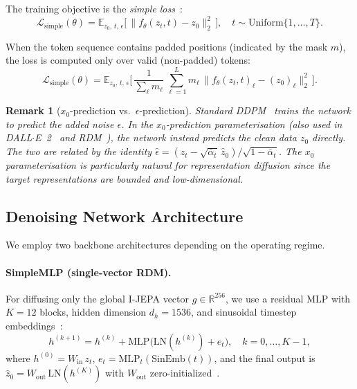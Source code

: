 \documentclass[12pt]{article}
\newtheorem{remark}{Remark}
\begin{document}
The training objective is the \emph{simple loss}~\cite{ho2020ddpm}:
\begin{equation}\label{eq:ddpm-loss}
    \mathcal{L}_{\mathrm{simple}}(\theta)
    = \mathbb{E}_{z_0,\, t,\, \epsilon}\!
    \bigl[\,\lVert f_\theta(z_t, t) - z_0 \rVert_2^2 \,\bigr],
    \quad t \sim \mathrm{Uniform}\{1, \ldots, T\}.
\end{equation}

When the token sequence contains padded positions (indicated by the mask $m$),
the loss is computed only over valid (non-padded) tokens:
\begin{equation}\label{eq:masked-loss}
    \mathcal{L}_{\mathrm{simple}}(\theta)
    = \mathbb{E}_{z_0,\, t,\, \epsilon}\!\biggl[\,
    \frac{1}{\sum_{\ell} m_\ell}\,
    \sum_{\ell=1}^{L} m_\ell\,
    \lVert f_\theta(z_t, t)_\ell - (z_0)_\ell \rVert_2^2
    \,\biggr].
\end{equation}

\begin{remark}[$x_0$-prediction vs.\ $\epsilon$-prediction]
\label{rem:x0-vs-eps}
Standard DDPM~\cite{ho2020ddpm} trains the network to predict the added noise
$\epsilon$.  In the $x_0$-prediction parameterisation
(also used in DALL$\cdot$E~2~\cite{ramesh2022hierarchical} and
RDM~\cite{bordes2022rdm}),
the network instead predicts the clean data $z_0$ directly.
The two are related by the identity
$\hat{\epsilon} = (z_t - \sqrt{\bar{\alpha}_t}\,\hat{z}_0) / \sqrt{1 - \bar{\alpha}_t}$.
The $x_0$ parameterisation is particularly natural for representation
diffusion since the target representations are bounded and low-dimensional.
\end{remark}

\subsection{Denoising Network Architecture}
\label{sec:denoising-arch}

We employ two backbone architectures depending on the operating regime.

\paragraph{SimpleMLP (single-vector RDM).}
For diffusing only the global I-JEPA vector $g \in \mathbb{R}^{256}$,
we use a residual MLP with $K = 12$ blocks,
hidden dimension $d_h = 1536$,
and sinusoidal timestep embeddings~\cite{vaswani2017attention}:
\begin{equation}\label{eq:mlp-block}
    h^{(k+1)} = h^{(k)} + \mathrm{MLP}\!\bigl(\mathrm{LN}(h^{(k)}) + e_t\bigr),
    \quad k = 0, \ldots, K-1,
\end{equation}
where $h^{(0)} = W_{\mathrm{in}}\, z_t$, $e_t = \mathrm{MLP}_t(\mathrm{SinEmb}(t))$,
and the final output is $\hat{z}_0 = W_{\mathrm{out}}\, \mathrm{LN}(h^{(K)})$
with $W_{\mathrm{out}}$ zero-initialized~\cite{goyal2017accurate}.
\end{document}
